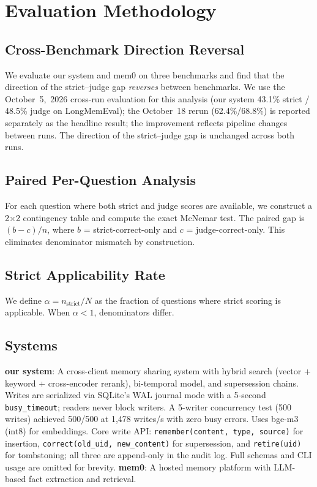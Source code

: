 \documentclass{llncs}
\begin{document}
\section{Evaluation Methodology}


\subsection{Cross-Benchmark Direction Reversal}
We evaluate our system and mem0 on three benchmarks and find that the direction of the strict--judge gap \emph{reverses} between benchmarks. We use the October~5,~2026 cross-run evaluation for this analysis (our system 43.1\% strict / 48.5\% judge on LongMemEval); the October~18 rerun (62.4\%/68.8\%) is reported separately as the headline result; the improvement reflects pipeline changes between runs. The direction of the strict--judge gap is unchanged across both runs.

\subsection{Paired Per-Question Analysis}
For each question where both strict and judge scores are available, we construct a 2$\times$2 contingency table and compute the exact McNemar test. The paired gap is $(b - c)/n$, where $b$ = strict-correct-only and $c$ = judge-correct-only. This eliminates denominator mismatch by construction.

\subsection{Strict Applicability Rate}
We define $\alpha = n_{\text{strict}}/N$ as the fraction of questions where strict scoring is applicable. When $\alpha < 1$, denominators differ.

\subsection{Systems}
\textbf{our system}: A cross-client memory sharing system with hybrid search (vector + keyword + cross-encoder rerank), bi-temporal model, and supersession chains. Writes are serialized via SQLite's WAL journal mode with a 5-second \texttt{busy\_timeout}; readers never block writers. A 5-writer concurrency test (500 writes) achieved 500/500 at 1{,}478 writes/s with zero busy errors. Uses bge-m3 (int8) for embeddings. Core write API: \texttt{remember(content, type, source)} for insertion, \texttt{correct(old\_uid, new\_content)} for supersession, and \texttt{retire(uid)} for tombstoning; all three are append-only in the audit log. Full schemas and CLI usage are omitted for brevity.
\textbf{mem0}: A hosted memory platform with LLM-based fact extraction and retrieval.
\end{document}
